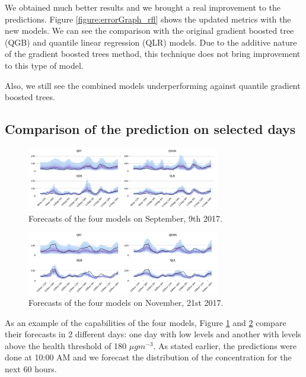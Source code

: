 \documentclass[a4paper,twocolumn,5p]{elsarticle}
\begin{document}
We obtained much better results and we brought a real improvement to
the predictions. Figure \ref{figure:errorGraph_rfl} shows the updated
metrics with the new models.  We can see the comparison with the
original gradient boosted tree (QGB) and 
quantile linear regression (QLR) models. Due to the additive 
nature of the gradient boosted trees method, this technique does not 
bring improvement to this type of model.

Also, we still see the combined models 
underperforming against quantile gradient boosted
trees.

\subsection{Comparison of the prediction on selected days}

\begin{figure}
  \centering
  \includegraphics[width=0.75\textwidth]{evoday1}
  \caption{Forecasts of the four models on September, 9th
    2017.}
  \label{figure:evoday1} 
\end{figure}

\begin{figure}
  \centering
  \includegraphics[width=0.75\textwidth]{evoday2}
  \caption{Forecasts of the four models on November, 21st 2017.}
  \label{figure:evoday2} 
\end{figure}

As an example of the capabilities of the four models, Figure
\ref{figure:evoday1} and \ref{figure:evoday2} compare their forecasts
in 2 different days: one day with low \no levels and
another with levels above the health threshold of 180 $\mu gm^{-3}$.
As stated earlier, the predictions were done at 10:00 AM and we
forecast the distribution of the concentration for the next 60 hours.
\end{document}
